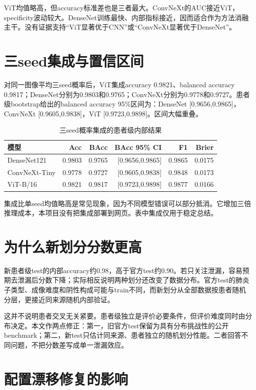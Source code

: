 ViT均值略高，但accuracy标准差也是三者最大。ConvNeXt的AUC接近ViT，specificity波动较大。DenseNet训练最快、内部指标接近，因而适合作为方法消融主干。没有证据支持“ViT显著优于CNN”或“ConvNeXt显著优于DenseNet”。

\section{三seed集成与置信区间}

对同一图像平均三seed概率后，ViT集成accuracy 0.9821、balanced accuracy 0.9817；DenseNet分别为0.9803和0.9765；ConvNeXt分别为0.9778和0.9727。患者级bootstrap给出的balanced accuracy 95\%区间为：DenseNet [0.9656,0.9865]，ConvNeXt [0.9605,0.9838]，ViT [0.9723,0.9898]。区间大幅重叠。

\begin{table}[H]
\centering
\caption{三seed概率集成的患者级内部结果}
\begin{tabular}{lrrrrr}
\toprule 模型 & Acc & BAcc & BAcc 95\% CI & F1 & Brier\\\midrule
DenseNet121 & 0.9803 & 0.9765 & [0.9656,0.9865] & 0.9865 & 0.0175\\
ConvNeXt-Tiny & 0.9778 & 0.9727 & [0.9605,0.9838] & 0.9848 & 0.0173\\
ViT-B/16 & 0.9821 & 0.9817 & [0.9723,0.9898] & 0.9877 & 0.0166\\\bottomrule
\end{tabular}
\end{table}

集成比单seed均值略高是常见现象，因为不同模型错误可以部分抵消。它增加三倍推理成本，本项目没有把集成部署到网页。表中集成仅用于稳定总结。

\section{为什么新划分分数更高}

新患者级test的内部accuracy约0.98，高于官方test约0.90。若只关注泄漏，容易预期去泄漏后分数下降；实际相反说明两种划分还改变了数据分布。官方test的肺炎子类型、成像难度和阴性构成可能与train不同，而新划分从全部数据按患者随机分层，更接近同来源随机内部验证。

这并不说明患者交叉无关紧要。患者级独立是评价必要条件，但评价难度同时由分布决定。本文作两点修正：第一，旧官方test保留为具有分布挑战性的公开benchmark；第二，新test只估计同来源、患者独立的随机划分性能。二者回答不同问题，不把分数差写成单一泄漏效应。

\section{配置漂移修复的影响}

